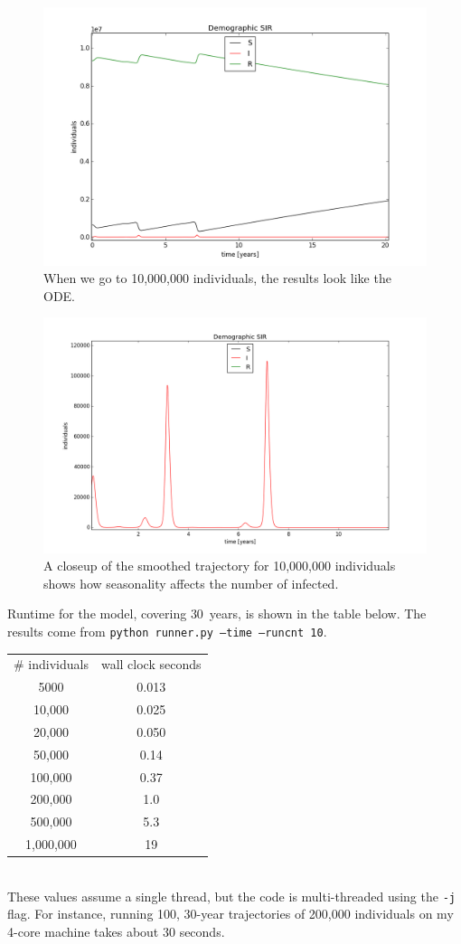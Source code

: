\documentclass{article}
\begin{document}
\begin{figure}
\centerline{\includegraphics[scale=0.8]{tenmillion}}
\caption{When we go to 10,000,000 individuals, the results look like the
ODE.}
\end{figure}


\begin{figure}
\centerline{\includegraphics[scale=0.8]{smoothedtenmillion}}
\caption{A closeup of the smoothed trajectory for 10,000,000 individuals
shows how seasonality affects the number of infected.}
\end{figure}

Runtime for the model, covering $30$~years, is shown in the table below.
The results come from \texttt{python runner.py --time --runcnt 10}. \\
\begin{tabular}{cc}
\# individuals & wall clock seconds \\
5000 & 0.013 \\
10,000 & 0.025 \\
20,000 & 0.050 \\
50,000 & 0.14 \\
100,000 & 0.37 \\
200,000 & 1.0 \\
500,000 & 5.3 \\
1,000,000 & 19
\end{tabular} \\
These values assume a single thread, but the code is multi-threaded
using the \texttt{-j} flag. For instance, running 100, 30-year trajectories
of 200,000 individuals on my 4-core machine takes about 30 seconds.
\end{document}

